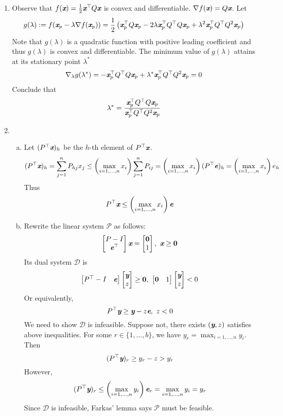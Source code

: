 \begin{enumerate}
\newpage
\item 
{}
Observe that $f(\textit{\textbf{x}}) = \frac{1}{2} \textit{\textbf{x}}^\top Q\textit{\textbf{x}}$ is convex and differentiable. $\nabla f(\textit{\textbf{x}}) = Q\textit{\textbf{x}}$. 
Let 
\[
g(\lambda):=f(\textit{\textbf{x}}_p -\lambda \nabla f(\textit{\textbf{x}}_p)) = \frac{1}{2} \left(\textit{\textbf{x}}_p^\top Q\textit{\textbf{x}}_p - 2\lambda \textit{\textbf{x}}_p^\top Q^\top Q\textit{\textbf{x}}_p + \lambda^2 \textit{\textbf{x}}_p^\top Q^\top Q^2 \textit{\textbf{x}}_p\right)
\]
Note that $g(\lambda)$ is a quadratic function with positive leading coefficient and thus $g(\lambda)$ is convex and differentiable. The minimum value of $g(\lambda)$ attains at its stationary point $\lambda^*$
\[
\nabla_\lambda g(\lambda^*)  = -\textit{\textbf{x}}_p^\top Q^\top Q\textit{\textbf{x}}_p + \lambda^* \textit{\textbf{x}}_p^\top Q^\top Q^2 \textit{\textbf{x}}_p = 0
\]
Conclude that
\[
\lambda^* = \frac{\textit{\textbf{x}}_p^\top Q^\top Q\textit{\textbf{x}}_p}{\textit{\textbf{x}}_p^\top Q^\top Q^2 \textit{\textbf{x}}_p}
\]

\newpage
\item 
{}
\begin{enumerate}[(a)]
	\item Let $(P^\top\textit{\textbf{x}})_h$ be the $h$-th element of $P^\top \textit{\textbf{x}}$.
	\[
	(P^\top \textit{\textbf{x}})_h = \sum_{j=1}^n P_{hj}x_j \le \left(\max_{i=1,\ldots,n} x_i\right) \sum_{j=1}^nP_{ij} = \left(\max_{i=1,\ldots,n} x_i\right) (P^\top \textit{\textbf{e}})_h = \left(\max_{i=1,\ldots,n} x_i\right)e_h
	\]
	Thus
	\[
	P^\top \textit{\textbf{x}} \le \left(\max_{i=1,\ldots,n} x_i\right) \textit{\textbf{e}}
	\]
	\item Rewrite the linear system $\mathcal{P}$ as follows:
	\[
	\begin{bmatrix}
	P -I\\
	\textit{\textbf{e}}^\top 
	\end{bmatrix} \textit{\textbf{x}} = \begin{bmatrix}
	\textbf{0} \\ 1
	\end{bmatrix}, ~\textit{\textbf{x}} \ge \textbf{0} 
	\]
	Its dual system $\mathcal{D}$ is
	\[
	\begin{bmatrix}
	P^\top - I & \textit{\textbf{e}} 
	\end{bmatrix} \begin{bmatrix}
	\textit{\textbf{y}} \\ z
	\end{bmatrix} \ge \textbf{0},~ \begin{bmatrix}
	\textbf{0} & 1
	\end{bmatrix} \begin{bmatrix}
	\textit{\textbf{y}} \\ z
	\end{bmatrix} < 0
	\]
	Or equivalently,  
	\[
	P^\top \textit{\textbf{y}} \ge \textit{\textbf{y}} - z\textit{\textbf{e}},~ z<0 
	\]
	We need to show $\mathcal{D}$ is infeasible. Suppose not, there exists $(\textit{\textbf{y}}, z)$ satisfies above inequalities. For some $r\in \{1,\ldots, b\}$, we have $y_r = \max_{i=1,\ldots,n} y_i$. Then 
	\[
	(P^\top \textit{\textbf{y}})_r \ge y_r - z > y_r
	\]
	However, $$
	(P^\top \textit{\textbf{y}})_r \le \left(\max_{i=1,\ldots,n} y_i\right) \textit{\textbf{e}}_r =\max_{i=1,\ldots,n} y_i = y_r
	$$
	Since $\mathcal{D}$ is infeasible, Farkas' lemma says $\mathcal{P}$ must be feasible.
	

\end{enumerate}
\end{enumerate}
